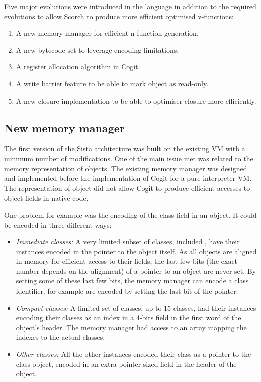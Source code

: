 \documentclass[a4paper,12pt,twoside]{../includes/ThesisStyle}
\begin{document}
Five major evolutions were introduced in the language in addition to the required evolutions to allow Scorch to produce more efficient optimised v-functions:
\begin{enumerate}
	\item A new memory manager for efficient n-function generation.
	\item A new bytecode set to leverage encoding limitations.
	\item A register allocation algorithm in Cogit.
	\item A write barrier feature to be able to mark object as read-only.
	\item A new closure implementation to be able to optimiser closure more efficiently.
\end{enumerate}

\subsection{New memory manager}

The first version of the Sista architecture was built on the existing VM with a minimum number of modifications. One of the main issue met was related to the memory representation of objects. The existing memory manager was designed and implemented before the implementation of Cogit for a pure interpreter VM. The representation of object did not allow Cogit to produce efficient accesses to object fields in native code.

One problem for example was the encoding of the class field in an object. It could be encoded in three different ways:
\begin{itemize}
	\item \emph{Immediate classes:} A very limited subset of classes, included , have their instances encoded in the pointer to the object itself. As all objects are aligned in memory for efficient access to their fields, the last few bits (the exact number depends on the alignment) of a pointer to an object are never set. By setting some of these last few bits, the memory manager can encode a class identifier.  for example are encoded by setting the last bit of the pointer.
	\item \emph{Compact classes:} A limited set of classes, up to 15 classes, had their instances encoding their classes as an index in a 4-bits field in the first word of the object's header. The memory manager had access to an array mapping the indexes to the actual classes.
	\item \emph{Other classes:} All the other instances encoded their class as a pointer to the class object, encoded in an extra pointer-sized field in the header of the object.
\end{itemize}
\end{document}

